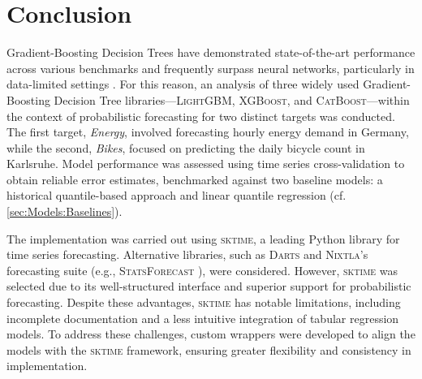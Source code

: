 \newpage
\section{Conclusion}
\label{ch:Conclusion}

Gradient-Boosting Decision Trees have demonstrated state-of-the-art performance across various benchmarks and frequently surpass neural networks, particularly in data-limited settings \parencites{shwartz-ziv_tabular_2021, grinsztajn_why_2022}. For this reason, an analysis of three widely used Gradient-Boosting Decision Tree libraries—\textsc{LightGBM}, \textsc{XGBoost}, and \textsc{CatBoost}—within the context of probabilistic forecasting for two distinct targets was conducted. The first target, \textit{Energy}, involved forecasting hourly energy demand in Germany, while the second, \textit{Bikes}, focused on predicting the daily bicycle count in Karlsruhe. Model performance was assessed using time series cross-validation to obtain reliable error estimates, benchmarked against two baseline models: a historical quantile-based approach and linear quantile regression (cf. \cref{sec:Models:Baselines}).

The implementation was carried out using \textsc{sktime}, a leading Python library for time series forecasting. Alternative libraries, such as \textsc{Darts} \parencite{herzen_darts_2022} and \textsc{Nixtla}’s forecasting suite (e.g., \textsc{StatsForecast} \parencite{azul_garza_statsforecast_2022}), were considered. However, \textsc{sktime} was selected due to its well-structured interface and superior support for probabilistic forecasting. Despite these advantages, \textsc{sktime} has notable limitations, including incomplete documentation and a less intuitive integration of tabular regression models. To address these challenges, custom wrappers were developed to align the models with the \textsc{sktime} framework, ensuring greater flexibility and consistency in implementation.

